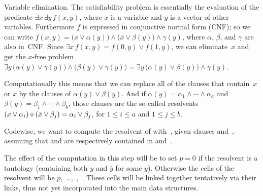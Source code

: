 Variable elimination. The satisfiability problem is essentially the
evaluation of the predicate $\exists x\,\exists y\,f(x,y)$, where
$x$ is a variable and $y$ is a vector of other variables.
Furthermore $f$ is expressed in conjunctive normal form ({\mc CNF});
so we can write $f(x,y)=\bigl(x\lor\alpha(y)\bigr)\land
\bigl(\bar x\lor\beta(y)\bigr)\land\gamma(y)$, where $\alpha$, $\beta$,
and $\gamma$ are also in~{\mc CNF}. Since $\exists x\,f(x,y)=
f(0,y)\lor f(1,y)$, we can eliminate~$x$ and get the $x$-free problem
$\exists y\,\bigl(\alpha(y)\lor\gamma(y)\bigr)\land
\bigl(\beta (y)\lor\gamma(y)\bigr)=
\exists y\,\bigl(\alpha(y)\lor\beta(y)\bigr)\land\gamma(y)$.

Computationally this means that
we can replace all of the clauses that contain~$x$
or $\bar x$ by the clauses of $\alpha(y)\lor\beta(y)$. And if
$\alpha(y)=\alpha_1\land\cdots\land\alpha_a$ and
$\beta(y)=\beta_1\land\cdots\land\beta_b$, those clauses are the
so-called resolvents
$(x\lor\alpha_i)\diamond(\bar x\lor\beta_j)=\alpha_i\lor\beta_j$,
for $1\le i\le a$ and $1\le j\le b$.

Codewise, we want to compute the resolvent of  with~,
given clauses  and~, assuming that  and  are
respectively contained in  and~.

The effect of the computation in this step
will be to set $p=0$ if the resolvent is a
tautology (containing both $y$ and $\bar y$ for some $y$).
Otherwise the cells of the resolvent will be
$p$,~\dots,~,~. These cells
will be
linked together tentatively via their  links, thus not yet
incorporated
into the main data structures.

